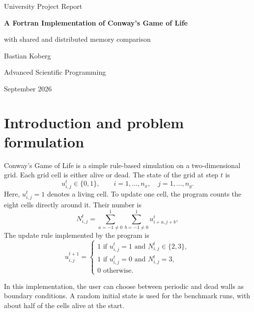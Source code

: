 \documentclass[11pt,a4paper]{article}
\begin{document}
\begin{titlepage}
    \centering
    \vspace*{2cm}
    {\Large University Project Report\par}
    \vspace{1.5cm}
    {\huge\bfseries A Fortran Implementation of Conway's Game of Life\par}
    \vspace{0.7cm}
    {\Large with shared and distributed memory comparison\par}
    \vfill
    {\large Bastian Koberg\par}
    \vspace{0.5cm}
    {\large Advanced Scientific Programming\par}
    \vspace{0.5cm}
    {\large September 2026\par}
\end{titlepage}

\clearpage
\tableofcontents
\clearpage

\section{Introduction and problem formulation}

Conway's Game of Life is a simple rule-based simulation on a two-dimensional
grid. Each grid cell is either alive or dead. The state of the grid at step $t$
is
\begin{equation}
    u^t_{i,j} \in \{0,1\},
    \qquad i=1,\ldots,n_x,\quad j=1,\ldots,n_y .
\end{equation}
Here, $u^t_{i,j}=1$ denotes a living cell. To update one cell, the program
counts the eight cells directly around it. Their number is
\begin{equation}
    N^t_{i,j} =
    \sum_{a=-1\ne 0}^{1}\sum_{b=-1\ne 0}^{1}
    u^t_{i+a,j+b},
\end{equation}
 The update rule implemented by the program is
\begin{equation}
u^{t+1}_{i,j} =
\begin{cases}
1 \text{ if } u^t_{i,j}=1 \text{ and } N^t_{i,j}\in\{2,3\},\\
1 \text{ if } u^t_{i,j}=0 \text{ and } N^t_{i,j}=3,\\
0 \text{ otherwise.}
\end{cases}
\label{eq:gol-rule}
\end{equation}

In this implementation, the user can choose between periodic and dead walls as 
boundary conditions. A random initial state is used for the benchmark runs, 
with about half of the cells alive at the start.
\end{document}
